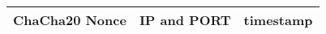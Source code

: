 \begin{tabularx}{.85\linewidth}{llX}
	\toprule
	ChaCha20 Nonce & IP and PORT & timestamp 
	\\
	\bottomrule
\end{tabularx}